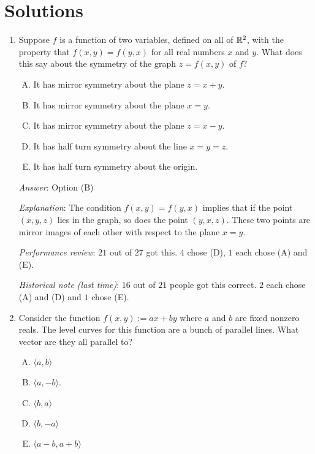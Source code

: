 \documentclass[10pt]{amsart}
\begin{document}
\section{Solutions}
\begin{enumerate}

\item Suppose $f$ is a function of two variables, defined on all of
  $\mathbb{R}^2$, with the property that $f(x,y) = f(y,x)$ for all real
  numbers $x$ and $y$. What does this say about the symmetry of the
  graph $z = f(x,y)$ of $f$?

  \begin{enumerate}[(A)]
  \item It has mirror symmetry about the plane $z = x + y$.
  \item It has mirror symmetry about the plane $x = y$.
  \item It has mirror symmetry about the plane $z = x - y$.
  \item It has half turn symmetry about the line $x = y = z$.
  \item It has half turn symmetry about the origin.
  \end{enumerate}

  {\em Answer}: Option (B)

  {\em Explanation}: The condition $f(x,y) = f(y,x)$ implies that if
  the point $(x,y,z)$ lies in the graph, so does the point
  $(y,x,z)$. These two points are mirror images of each other with
  respect to the plane $x = y$.

  {\em Performance review}: $21$ out of $27$ got this. $4$ chose (D),
  $1$ each chose (A) and (E).

  {\em Historical note (last time)}: $16$ out of $21$ people got this
  correct. $2$ each chose (A) and (D) and $1$ chose (E).

\item Consider the function $f(x,y) := ax + by$ where $a$ and $b$ are
  fixed nonzero reals. The level curves for this function are a bunch
  of parallel lines. What vector are they all parallel to?

  \begin{enumerate}[(A)]
  \item $\langle a,b \rangle$
  \item $\langle a,-b \rangle$.
  \item $\langle b,a \rangle$
  \item $\langle b,-a \rangle$
  \item $\langle a - b, a + b \rangle$
  \end{enumerate}


\end{enumerate}
\end{document}
